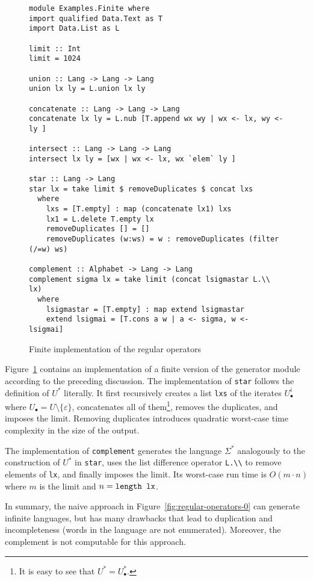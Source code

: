 \begin{figure}[tp]
\begin{lstlisting}
module Examples.Finite where
import qualified Data.Text as T
import Data.List as L

limit :: Int
limit = 1024

union :: Lang -> Lang -> Lang
union lx ly = L.union lx ly

concatenate :: Lang -> Lang -> Lang
concatenate lx ly = L.nub [T.append wx wy | wx <- lx, wy <- ly ]

intersect :: Lang -> Lang -> Lang
intersect lx ly = [wx | wx <- lx, wx `elem` ly ]

star :: Lang -> Lang
star lx = take limit $ removeDuplicates $ concat lxs
  where
    lxs = [T.empty] : map (concatenate lx1) lxs
    lx1 = L.delete T.empty lx
    removeDuplicates [] = []
    removeDuplicates (w:ws) = w : removeDuplicates (filter (/=w) ws)

complement :: Alphabet -> Lang -> Lang
complement sigma lx = take limit (concat lsigmastar L.\\ lx) 
  where
    lsigmastar = [T.empty] : map extend lsigmastar
    extend lsigmai = [T.cons a w | a <- sigma, w <- lsigmai]
\end{lstlisting}
  \caption{Finite implementation of the regular operators}
  \label{fig:finite-regular-operators}
\end{figure}
Figure~\ref{fig:finite-regular-operators} contains an implementation
of a finite version of the generator module according to the preceding
discussion. The implementation of \texttt{star} follows the definition
of $U^*$ literally. It first recursively creates a list \texttt{lxs}
of the iterates $U_\bullet^i$ where
$U_\bullet = U \setminus \{\varepsilon\}$, concatenates all of
them\footnote{It is easy to see that $U^* = U_\bullet^*$.}, removes
the duplicates, and imposes the limit. Removing duplicates introduces
quadratic worst-case time complexity in the size of the output.

The implementation of \texttt{complement} generates the language
$\Sigma^*$ analogously to the construction of $U^*$ in
\texttt{star}, uses the list difference operator
\texttt{L.\textbackslash\textbackslash} to remove elements of
\texttt{lx}, and finally imposes the limit. Its worst-case run time is
$O(m\cdot n)$ where $m$ is the limit and $n = \code{length lx}$.

In summary, the naive approach in
Figure~\ref{fig:regular-operators-0} can generate infinite languages,
but has many drawbacks that lead to duplication and incompleteness
(words in the language are not enumerated). Moreover, the complement
is not computable for this approach.

